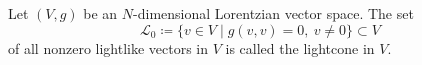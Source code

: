 Let $(V, g)$ be an $N$-dimensional Lorentzian vector space. The set
$$\mathcal{L}_0 \coloneqq \{ v \in V \mid g(v, v) = 0,\ v \neq 0 \} \subset V$$
of all nonzero lightlike vectors in $V$ is called the lightcone in $V$.
